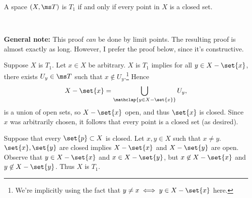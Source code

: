 \documentclass{fkpset}
\newenvironment{why}{\begin{adjustwidth}{0.01\linewidth}{0.05\linewidth}~}%
  {\end{adjustwidth}}
\begin{document}
  \begin{problem}[5.1]
    A space $(X, \ms T)$ is $T_1$ if and only if every point in $X$ is
    a closed set.
  \end{problem}
  \begin{why}
    \begin{leftbar}
      \textbf{General note:} This proof \emph{can} be done by limit
      points. The resulting proof is almost exactly as long. However,
      I prefer the proof below, since it's constructive.
    \end{leftbar}
  \end{why}
  \begin{solution}
    \begin{iffproof}
      \item Suppose $X$ is $T_1$. Let $x \in X$ be arbitrary. $X$ is
        $T_1$ implies for all $y \in X - \set{x}$, there exists $U_y
        \in \ms T$ such that $x \not \in U_y$.\footnote{We're
          implicitly using the fact that $y \neq x \iff y \in X -
          \set{x}$ here.} Hence
        \[
          X - \set{x} = \bigcup_{\mathclap{y \in X - \set{x}}} U_y,
        \]
        is a union of open sets, so $X - \set{x}$ open, and thus
        $\set{x}$ is closed. Since $x$ was arbitrarily chosen, it
        follows that every point is a closed set (as desired).
      \item Suppose that every $\set{p} \subset X$ is closed. Let $x,y
        \in X$ such that $x \neq y$. $\set{x}, \set{y}$ are closed
        implies $X - \set{x}$ and $X - \set{y}$ are open. Observe that
        $y \in X - \set{x}$ and $x \in X - \set{y}$, but $x \not \in X
        - \set{x}$ and $y \not \in X - \set{y}$. Thus $X$ is $T_1$.
    \end{iffproof}
  \end{solution}
  \clearpage
\end{document}
